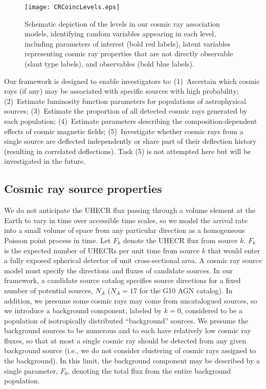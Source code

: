 \begin{figure}
\centerline{\texttt{[image: CRCoincLevels.eps]}}
\caption{Schematic depiction of the levels in our cosmic ray association
models, identifying random variables appearing in each level, including
parameters of interest (bold red labels), latent variables representing cosmic ray
properties that are not directly observable (slant type labels), and
observables (bold blue labels).}
\label{fig:levels}
\end{figure}

Our framework is designed to enable investigators to:
(1)~Ascertain which cosmic rays (if any) may be associated with specific
sources with high probability; (2)~Estimate luminosity function parameters
for populations of astrophysical sources; (3)~Estimate the proportion of all
detected cosmic rays generated by each population; (4)~Estimate parameters
describing the composition-dependent effects of cosmic magnetic fields;
(5)~Investigate whether cosmic rays from a single source are deflected
independently or share part of their deflection history (resulting in
correlated deflections).  Task (5) is not attempted here but will be
investigated in the future.

\subsection{Cosmic ray source properties}


We do not anticipate the UHECR flux passing through a volume element at the
Earth to vary in time over accessible time scales, so we model the
arrival rate into a small volume of space from any particular direction as a
homogeneous Poisson point process in time.  Let $F_k$ denote the UHECR flux
from source $k$.  $F_k$ is the expected number of UHECRs per unit time from
source $k$ that would enter a fully exposed spherical detector of unit
cross-sectional area.  A cosmic ray source model must specify the directions
and fluxes of candidate sources.  In our framework, a candidate source
catalog specifies source directions for a fixed number of potential sources,
$N_A$ ($N_A = 17$ for the G10 AGN catalog).  In addition, we presume some
cosmic rays may come from uncatalogued sources, so we introduce a background
component, labeled by $k=0$, considered to be a population of isotropically
distributed ``background'' sources.   We presume the background sources to
be numerous and to each have relatively low cosmic ray fluxes, so that at
most a single cosmic ray should be detected from any given background source
(i.e., we do not consider clustering of cosmic rays assigned to the
background).  In this limit, the background component may be described
by a single parameter, $F_0$, denoting the total flux from the entire
background population.

